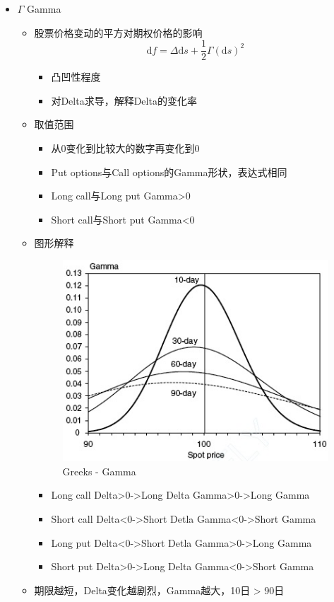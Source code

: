 \documentclass[a4paper,6pt,twoside,openany]{article}
\begin{document}
\begin{itemize}
\item $\Gamma$ Gamma
  \begin{itemize}
  \item 股票价格变动的平方对期权价格的影响
    $$\mathrm{d}f = \Delta \mathrm{d}s + \frac{1}{2} \Gamma (\mathrm{d}s)^2$$
    \begin{itemize}
    \item 凸凹性程度
    \item 对Delta求导，解释Delta的变化率
    \end{itemize}
  \item 取值范围
    \begin{itemize}
    \item 从0变化到比较大的数字再变化到0
    \item Put options与Call options的Gamma形状，表达式相同
    \item Long call与Long put Gamma>0
    \item Short call与Short put Gamma<0
    \end{itemize}
  \item 图形解释
     \begin{figure}[ht!]
      \centering \includegraphics[width=100mm]{Greeks_Gamma.jpg}
      \caption{Greeks - Gamma}
    \end{figure}
    \begin{itemize}
    \item Long call Delta>0->Long Delta Gamma>0->Long Gamma
    \item Short call Delta<0->Short Detla Gamma<0->Short Gamma
    \item Long put Delta<0->Short Detla Gamma>0->Long Gamma
    \item Short put Delta>0->Long Delta Gamma<0->Short Gamma
    \end{itemize}
  \item 期限越短，Delta变化越剧烈，Gamma越大，10日 > 90日

\end{itemize}
\end{itemize}
\end{document}
